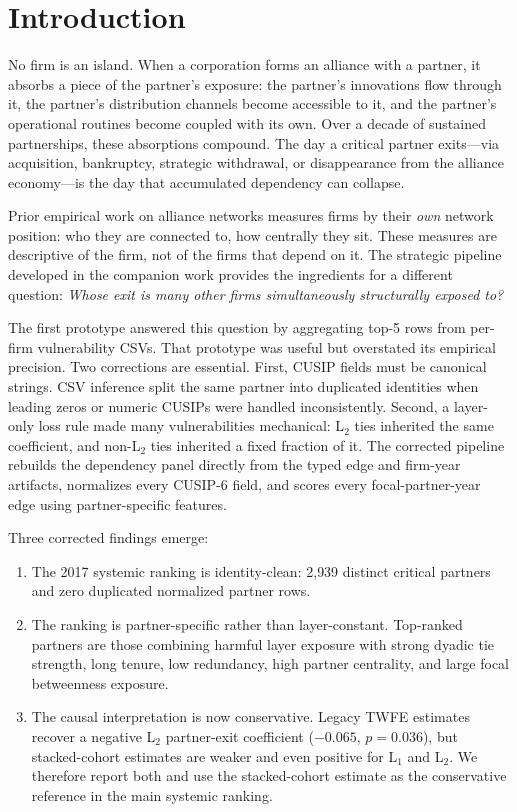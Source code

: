 \documentclass[11pt,letterpaper]{article}
\begin{document}
\section{Introduction}

No firm is an island.  When a corporation forms an alliance with a
partner, it absorbs a piece of the partner's exposure: the partner's
innovations flow through it, the partner's distribution channels become
accessible to it, and the partner's operational routines become coupled
with its own.  Over a decade of sustained partnerships, these
absorptions compound.  The day a critical partner exits---via
acquisition, bankruptcy, strategic withdrawal, or disappearance from
the alliance economy---is the day that accumulated dependency can
collapse.

Prior empirical work on alliance networks \citep{burt1992, ahuja2000,
phelps2010} measures firms by their \emph{own} network position: who
they are connected to, how centrally they sit.  These measures are
descriptive of the firm, not of the firms that depend on it.  The
strategic pipeline developed in the companion work provides the
ingredients for a different question: \emph{Whose exit is many other
firms simultaneously structurally exposed to?}

The first prototype answered this question by aggregating top-5 rows
from per-firm vulnerability CSVs.  That prototype was useful but
overstated its empirical precision.  Two corrections are essential.
First, CUSIP fields must be canonical strings.  CSV inference split the
same partner into duplicated identities when leading zeros or numeric
CUSIPs were handled inconsistently.  Second, a layer-only loss rule
made many vulnerabilities mechanical: L$_2$ ties inherited the same
coefficient, and non-L$_2$ ties inherited a fixed fraction of it.  The
corrected pipeline rebuilds the dependency panel directly from the
typed edge and firm-year artifacts, normalizes every CUSIP-6 field, and
scores every focal-partner-year edge using partner-specific features.

Three corrected findings emerge:
\begin{enumerate}
  \item The 2017 systemic ranking is identity-clean: 2{,}939 distinct
  critical partners and zero duplicated normalized partner rows.
  \item The ranking is partner-specific rather than layer-constant.
  Top-ranked partners are those combining harmful layer exposure with
  strong dyadic tie strength, long tenure, low redundancy, high partner
  centrality, and large focal betweenness exposure.
  \item The causal interpretation is now conservative.  Legacy TWFE
  estimates recover a negative L$_2$ partner-exit coefficient
  ($-0.065$, $p=0.036$), but stacked-cohort estimates are weaker and
  even positive for L$_1$ and L$_2$.  We therefore report both and use
  the stacked-cohort estimate as the conservative reference in the main
  systemic ranking.
\end{enumerate}
\end{document}
